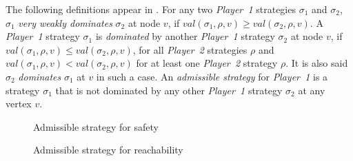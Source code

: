 The following definitions appear in \cite{OmegaRegularGames}. For any two \textit{Player~1} strategies $\sigma_{1}$ and $\sigma_{2}$, $\sigma_{1}$ \textit{very weakly dominates} $\sigma_{2}$ at node $v$, if $val(\sigma_{1}, \rho, v) \geq val(\sigma_{2}, \rho, v)$.
A \textit{Player~1} strategy $\sigma_{1}$ is \textit{dominated} by another \textit{Player~1} strategy $\sigma_{2}$ at node $v$, if $val(\sigma_{1}, \rho, v) \leq val( \sigma_{2}, \rho, v)$, for all \textit{Player~2} strategies $\rho$ and $val(\sigma_{1}, \rho, v) < val(\sigma_{2}, \rho, v)$ for at least one \textit{Player~2} strategy $\rho$. It is also said $\sigma_{2}$ \textit{dominates} $\sigma_{1}$ at $v$ in such a case.
An \textit{admissible strategy} for \textit{Player~1} is a strategy $\sigma_{1}$ that is not dominated by any other \textit{Player~1} strategy $\sigma_{2}$ at any vertex $v$. 
\begin{figure}[thpb]
	\centering
	\caption{Admissible strategy for safety}
	\label{figurelabel7}
\end{figure}
\begin{figure}[thpb]
	\centering
	\caption{Admissible strategy for reachability}
	\label{figurelabel8}
\end{figure}

